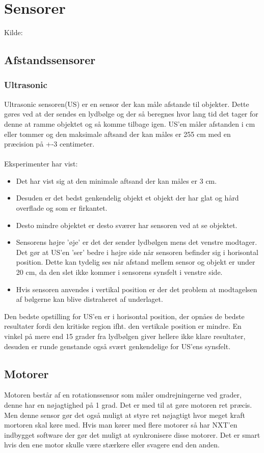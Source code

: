 \documentclass[a4paper,12pt]{report}
\begin{document}
\section{Sensorer}
Kilde: \cite{tikNXT}
\subsection{Afstandssensorer}
\subsubsection{Ultrasonic}
Ultrasonic sensoren(US) er en sensor der kan måle afstande til objekter. Dette gøres ved at der sendes en lydbølge og der så beregnes hvor lang tid det tager for denne at ramme objektet og så komme tilbage igen.
US'en måler afstanden i cm eller tommer og den maksimale aftsand der kan måles er 255 cm med en præcision på +-3 centimeter.
\\
\\
Eksperimenter\cite{tikNXT} har vist:
\begin{itemize}
\item Det har vist sig at den minimale aftsand der kan måles er 3 cm.
\item Desuden er det bedst genkendelig objekt et objekt der har glat og hård overflade og som er firkantet.
\item Desto mindre objektet er desto sværer har sensoren ved at se objektet.
\item Sensorens højre 'øje' er det der sender lydbølgen mens det venstre modtager.
Det gør at US'en 'ser' bedre i højre side når sensoren befinder sig i horisontal position.
Dette kan tydelig ses når afstand mellem sensor og objekt er under 20 cm, da den slet ikke kommer i sensorens synsfelt i venstre side.
\item Hvis sensoren anvendes i vertikal position er der det problem at modtagelsen af bølgerne kan blive distraheret af underlaget.
\end{itemize}

Den bedste opstilling for US'en er i horisontal position, der opnåes de bedste resultater fordi den kritiske region ifht. den vertikale position er mindre.
En vinkel på mere end 15 grader fra lydbølgen giver hellere ikke klare resultater, desuden er runde genstande også svært genkendelige for US'ens synsfelt.

\subsection{Motorer}
Motoren består af en rotationssensor som måler omdrejningerne ved grader, denne har en nøjagtighed på 1 grad. Det er med til at gøre motoren ret præcis. Men denne sensor gør det også muligt at styre ret nøjagtigt hvor meget kraft mortoren skal køre med.
Hvis man kører med flere motorer så har NXT'en indbygget software der gør det muligt at synkronisere disse motorer.
Det er smart hvis den ene motor skulle være stærkere eller svagere end den anden.
\end{document}
